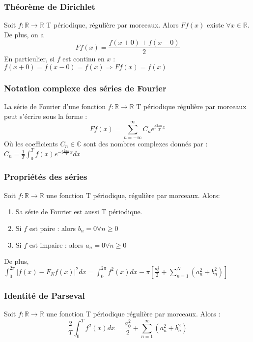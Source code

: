\documentclass[../main.tex]{subfiles}
\begin{document}
\subsubsection{Théorème de Dirichlet}
Soit $f:\mathbb{R}\rightarrow \mathbb{R}$ T périodique, régulière par morceaux. Alors $F f(x)$ existe $\forall x\in \mathbb{R}$. De plus, on a \\
\begin{equation}
    F f(x) = \frac{f(x+0)+f(x-0)}{2}
\end{equation}
En particulier, si $f$ est continu en $x$ : $f(x+0) = f(x-0)=f(x) \Rightarrow Ff(x) = f(x)$\\

\subsubsection{Notation complexe des séries de Fourier}
La série de Fourier d'une fonction $f:\mathbb{R}\rightarrow \mathbb{R}$ T périodique régulière par morceaux peut s'écrire sous la forme :\\
\begin{equation}
    Ff(x) = \sum_{n=-\infty}^{\infty}C_n e^{i\frac{2\pi n}{T}x}
\end{equation}
Où les coefficients $C_n \in \mathbb{C}$ sont des nombres complexes donnés par :\\
$C_n = \frac{1}{T} \int_0^T f(x) e^{-i\frac{2\pi n}{T}x}dx$

\subsubsection{Propriétés des séries}
Soit $f:\mathbb{R} \rightarrow\mathbb{R}$ une fonction T périodique, régulière par morceaux. Alors:\\
\begin{enumerate}
    \item Sa série de Fourier est aussi T périodique.\\
    \item Si $f$ est paire : alors $b_n = 0 \forall n\geq 0$\\
    \item Si $f$ est impaire : alors $a_n = 0 \forall n\geq 0$\\
\end{enumerate}
De plus, $\int_0^{2\pi} |f(x) - F_N f(x)|^2dx = \int_0^{2\pi} f^2(x) dx-\pi [\frac{a^2_0}{2}+\sum_{n=1}^N(a_n^2+b_n^2)]$

\subsubsection{Identité de Parseval}
Soit $f:\mathbb{R} \rightarrow \mathbb{R}$ une fonction T périodique régulière par morceaux. Alors : \\
\begin{equation}
    \frac{2}{T}\int_0^T f^2(x)dx = \frac{a_0^2}{2} + \sum_{n=1}^{\infty} (a_n^2+ b_n^2)
\end{equation}
\end{document}
